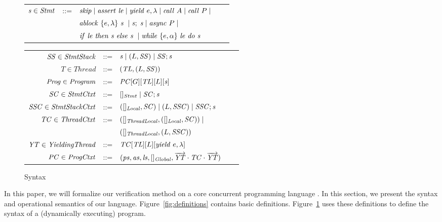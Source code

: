\begin{figure}
\setlength{\tabcolsep}{3pt}
\begin{tabular}{rclcl}
$\mathit{s} \in \mathit{Stmt}$ &::= & $\mathit{skip} \mid \mathit{assert}\ \mathit{le} \mid \mathit{yield}\ e,\lambda \mid \mathit{call}\ A \mid \mathit{call}\ P \mid$ \\
                  & & $\mathit{ablock}\ {\{e,\lambda\}}\ {\mathit{s}}\  \mid \mathit{s};\;\mathit{s} \mid \mathit{async}\ P \mid$\\
                  & & ${\mathit{if}\ {\mathit{le}}\ }{\mathit{then}\ {\mathit{s}}\ }{\mathit{else}\ {\mathit{s}}\ } \mid \mathit{while}\ \{{e,\alpha}\}\ {{\mathit{le}}\ } \mathit{do}\ {{\mathit{s}}\ }$ \vspace{6pt} \\
\end{tabular}
\begin{tabular}{rclcl}
$\mathit{SS} \in \mathit{StmtStack}$ &::= & $\mathit{s} \mid (L,\mathit{SS}) \mid \mathit{SS};\mathit{s}$ \\
$T \in \mathit{Thread}$ &::= &$(\mathit{TL}, (L, \mathit{SS}))$ \\
$\mathit{Prog} \in \mathit{Program}$ &::= & $\mathit{PC}[G][\mathit{TL}][L][\mathit{s}]$ \vspace{6pt} \\
$\mathit{SC} \in \mathit{StmtCtxt}$ &::= &$[]_{Stmt} \mid \mathit{SC};\mathit{s}$ \\
$\mathit{SSC} \in \mathit{StmtStackCtxt}$ &::= & $([]_{\mathit{Local}}, \mathit{SC}) \mid (L,\mathit{SSC}) \mid \mathit{SSC};\mathit{s}$ \\
$\mathit{TC} \in \mathit{ThreadCtxt}$ &::= &$([]_{\mathit{ThreadLocal}}, ([]_{\mathit{Local}}, \mathit{SC})) \mid$ \\
 & &$([]_{\mathit{ThreadLocal}}, (L, \mathit{SSC}))$ \\
$\mathit{YT} \in \mathit{YieldingThread}$ &::= &$\mathit{TC}[\mathit{TL}][L][\mathit{yield}\ e,\lambda]$ \\
$\mathit{PC} \in \mathit{ProgCtxt}$ &::= & $(\mathit{ps}, \mathit{as}, \mathit{ls}, []_{\mathit{Global}}, \overrightarrow{\mathit{YT}} \cdot \mathit{TC} \cdot \overrightarrow{\mathit{YT}})$
\end{tabular}
\caption{Syntax}
\label{fig:syntax}
\end{figure}

In this paper, we will formalize our verification method on a core concurrent programming language \civl.
In this section, we present the syntax and operational semantics of our language.
Figure~\ref{fig:definitions} contains basic definitions.
Figure~\ref{fig:syntax} uses these definitions to define the syntax of a (dynamically executing) \civl program.


